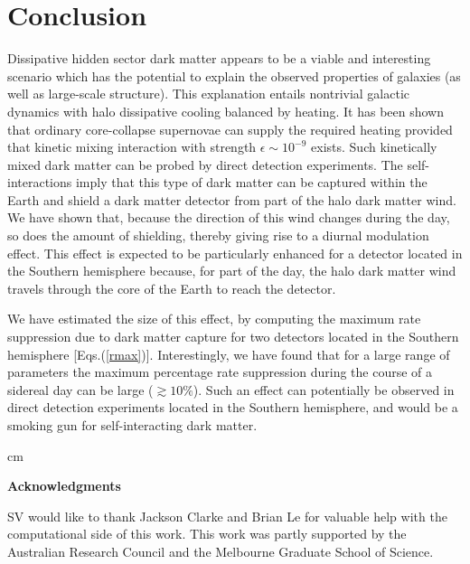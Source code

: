 \documentclass[12pt]{article}
\begin{document}

\section{Conclusion}

Dissipative hidden sector dark matter appears to be a viable and interesting scenario which has the potential to explain the observed properties of galaxies (as well as large-scale structure). This explanation entails nontrivial galactic dynamics with halo dissipative cooling balanced by heating. It has been shown that ordinary core-collapse supernovae can supply the required heating provided that kinetic mixing interaction with strength $\epsilon \sim 10 ^{-9}$ exists. Such kinetically mixed dark matter can be probed by direct detection experiments. The self-interactions imply that this type of dark matter can be captured within the Earth and shield a dark matter detector from part of the halo dark matter wind. We have shown that, because the direction of this wind changes during the day, so does the amount of shielding, thereby giving rise to a diurnal modulation effect. This effect is expected to be particularly enhanced for a detector located in the Southern hemisphere because, for part of the day, the halo dark matter wind travels through the core of the Earth to reach the detector.

We have estimated the size of this effect, by computing the maximum rate suppression due to dark matter capture for two detectors located in the Southern hemisphere [Eqs.(\ref{rmax})]. Interestingly, we have found that for a large range of parameters the maximum percentage rate suppression during the course of a sidereal day can be large ($\gtrsim 10\%$). Such an effect can potentially be observed in direct detection experiments located in the Southern hemisphere, and would be a smoking gun for self-interacting dark matter.


 cm


\begin{flushleft}

{\Large \bf Acknowledgments}

\vskip 0.3cm
\noindent
SV would like to thank Jackson Clarke and Brian Le for valuable help with the computational side of this work. This work was partly supported by the Australian Research Council and the Melbourne Graduate School of Science.

\end{flushleft}
\end{document}
